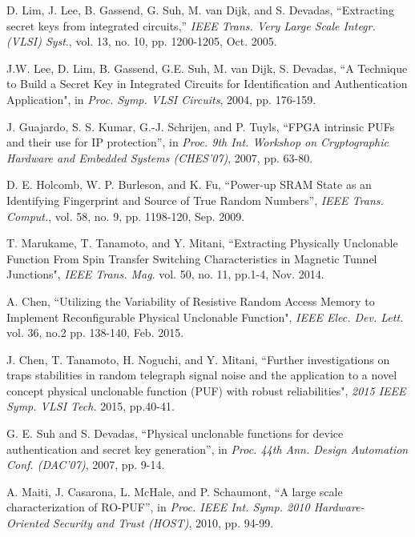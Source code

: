 ﻿\documentclass[aps,preprint,prb,superscriptaddress,amsmath,showpacs,tightenlines]{revtex4}
\begin{document}
\begin{thebibliography}{99}


 D. Lim, J. Lee, B. Gassend, G. Suh, M. van Dijk, and S. Devadas, ``Extracting
secret keys from integrated circuits,” {\it IEEE Trans. Very Large
Scale Integr. (VLSI) Syst}., vol. 13, no. 10, pp. 1200-1205, Oct. 2005.

 J.W. Lee, D. Lim, B. Gassend, G.E. Suh, M. van Dijk, S.
Devadas, ``A Technique to Build a Secret Key in Integrated
Circuits for Identification and Authentication Application", in {\it Proc.
Symp. VLSI Circuits},  2004, pp. 176-159.

 J. Guajardo, S. S. Kumar, G.-J. Schrijen, and P. Tuyls, “FPGA intrinsic
PUFs and their use for IP protection”, in {\it Proc. 9th Int. Workshop on
Cryptographic Hardware and Embedded Systems (CHES’07)}, 2007,
pp. 63-80.

D. E. Holcomb, W. P. Burleson, and K. Fu, ``Power-up SRAM State as an Identifying Fingerprint and Source of True Random Numbers”, {\it IEEE Trans. Comput.}, vol. 58, no. 9, pp. 1198-120, Sep. 2009. 



T. Marukame, T. Tanamoto, and Y. Mitani,
``Extracting Physically Unclonable Function From Spin Transfer Switching Characteristics in Magnetic Tunnel Junctions", {\it IEEE Trans. Mag}. vol. 50, no. 11,  pp.1-4, Nov. 2014. 

A. Chen,
``Utilizing the Variability of Resistive Random Access Memory to Implement Reconfigurable Physical Unclonable Function", 
{\it IEEE Elec. Dev. Lett.}  vol. 36, no.2 pp. 138-140, Feb. 2015.

J. Chen, T. Tanamoto, H. Noguchi, and Y. Mitani,
``Further investigations on traps stabilities in random telegraph signal noise and the application to a novel concept physical unclonable function (PUF) with robust reliabilities", 
{\it 2015 IEEE Symp. VLSI Tech.}  2015, pp.40-41.

 G. E. Suh and S. Devadas, “Physical unclonable functions for device
authentication and secret key generation”, in {\it Proc. 44th Ann. Design
Automation Conf. (DAC’07)}, 2007, pp. 9-14.

 A. Maiti, J. Casarona, L. McHale, and P. Schaumont, “A large scale
characterization of RO-PUF”, in {\it Proc. IEEE Int. Symp. 2010 Hardware-
Oriented Security and Trust (HOST)}, 2010, pp. 94-99.


\end{thebibliography}
\end{document}
